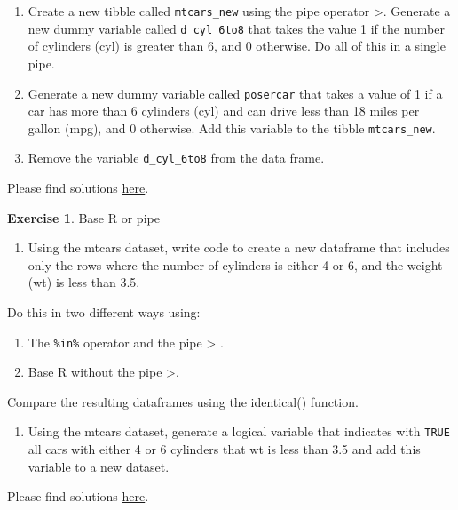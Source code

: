 \documentclass[
  12pt,
  oneside]{book}
\providecommand{\tightlist}{%
  \setlength{\itemsep}{0pt}\setlength{\parskip}{0pt}}
\theoremstyle{definition}
\theoremstyle{definition}
\theoremstyle{definition}
\newtheorem{exercise}{Exercise}[chapter]
\theoremstyle{definition}
\theoremstyle{remark}
\begin{document}
\begin{enumerate}
\def\labelenumi{\alph{enumi})}
\item
  Create a new tibble called \texttt{mtcars\_new} using the pipe operator \textbar\textgreater. Generate a new dummy variable called \texttt{d\_cyl\_6to8} that takes the value 1 if the number of cylinders (cyl) is greater than 6, and 0 otherwise. Do all of this in a single pipe.
\item
  Generate a new dummy variable called \texttt{posercar} that takes a value of 1 if a car has more than 6 cylinders (cyl) and can drive less than 18 miles per gallon (mpg), and 0 otherwise. Add this variable to the tibble \texttt{mtcars\_new}.
\item
  Remove the variable \texttt{d\_cyl\_6to8} from the data frame.
\end{enumerate}

Please find solutions \href{https://raw.githubusercontent.com/hubchev/courses/main/scr/exe_genanddrop.R}{here}.

\begin{exercise}
\protect\hypertarget{exr:baseorpipe}{}\label{exr:baseorpipe}Base R or pipe

\begin{enumerate}
\def\labelenumi{\alph{enumi})}
\tightlist
\item
  Using the mtcars dataset, write code to create a new dataframe that includes only the rows where the number of cylinders is either 4 or 6, and the weight (wt) is less than 3.5.
\end{enumerate}

Do this in two different ways using:

\begin{enumerate}
\def\labelenumi{\arabic{enumi}.}
\tightlist
\item
  The \texttt{\%in\%} operator and the pipe \textbar\textgreater{} .
\item
  Base R without the pipe \textbar\textgreater.
\end{enumerate}

Compare the resulting dataframes using the identical() function.

\begin{enumerate}
\def\labelenumi{\alph{enumi})}
\setcounter{enumi}{1}
\tightlist
\item
  Using the mtcars dataset, generate a logical variable that indicates with \texttt{TRUE} all cars with either 4 or 6 cylinders that wt is less than 3.5 and add this variable to a new dataset.
\end{enumerate}

Please find solutions \href{https://raw.githubusercontent.com/hubchev/courses/main/scr/exe_base_pipe.R}{here}.
\end{exercise}
\end{document}

